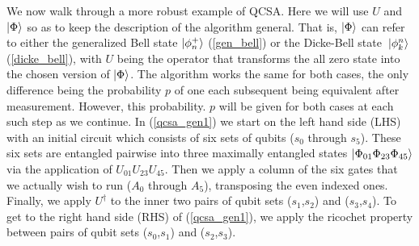 \documentclass[Dual]{msu-thesis}
\begin{document}
We now walk through a more robust example of QCSA. Here we will use $U$ and $\ket{\Phi}$ so as to keep the description of the algorithm general. That is, $\ket{\Phi}$ can refer to either the generalized Bell state $\ket{\phi^+_n}$ (\ref{gen_bell}) or the Dicke-Bell state $\ket*{\phi^n_k}$ (\ref{dicke_bell}), with $U$ being the operator that transforms the all zero state into the chosen version of $\ket{\Phi}$. The algorithm works the same for both cases, the only difference being the probability $p$ of one each subsequent being equivalent after measurement. However, this probability. $p$ will be given for both cases at each such step as we continue. In (\ref{qcsa_gen1}) we start on the left hand side (LHS) with an initial circuit which consists of six sets of qubits ($s_0$ through $s_5$). These six sets are entangled pairwise into three maximally entangled states $\ket{\Phi_{01}\Phi_{23}\Phi_{45}}$ via the application of $U_{01}U_{23}U_{45}$. Then we apply a column of the six gates that we actually wish to run ($A_0$ through $A_5$), transposing the even indexed ones. Finally, we apply $U^\dagger$ to the inner two pairs of qubit sets ($s_1$,$s_2$) and ($s_3$,$s_4$). To get to the right hand side (RHS) of (\ref{qcsa_gen1}), we apply the ricochet property between pairs of  qubit sets ($s_0$,$s_1$) and ($s_2$,$s_3$).
\end{document}
